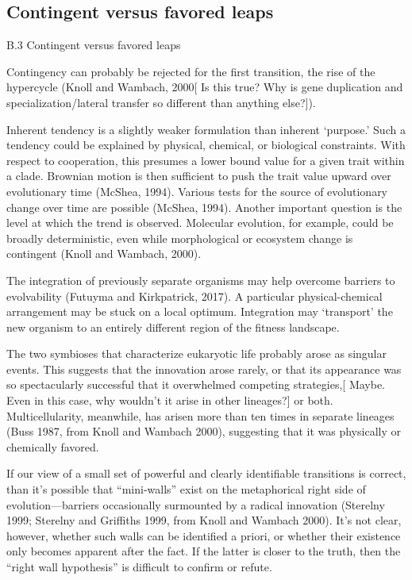 \documentclass{tufte-book} %
\begin{document}
\subsection{Contingent versus favored leaps}

B.3  Contingent versus favored leaps


Contingency can probably be rejected for the first transition, the rise of the hypercycle (Knoll and Wambach, 2000[ Is this true? Why is gene duplication and specialization/lateral transfer so different than anything else?]).

Inherent tendency is a slightly weaker formulation than inherent ‘purpose.’ Such a tendency could be explained by physical, chemical, or biological constraints.  With respect to cooperation, this presumes a lower bound value for a given trait within a clade. Brownian motion is then sufficient to push the trait value upward over evolutionary time (McShea, 1994). 
Various tests for the source of evolutionary change over time are possible (McShea, 1994).
Another important question is the level at which the trend is observed. Molecular evolution, for example, could be broadly deterministic, even while morphological or ecosystem change is contingent (Knoll and Wambach, 2000).

The integration of previously separate organisms may help overcome barriers to evolvability (Futuyma and Kirkpatrick, 2017). A particular physical-chemical arrangement may be stuck on a local optimum. Integration may ‘transport’ the new organism to an entirely different region of the fitness landscape.

The two symbioses that characterize eukaryotic life probably arose as singular events. This suggests that the innovation arose rarely, or that its appearance was so spectacularly successful that it overwhelmed competing strategies,[ Maybe. Even in this case, why wouldn’t it arise in other lineages?] or both.  Multicellularity, meanwhile, has arisen more than ten times in separate lineages (Buss 1987, from Knoll and Wambach 2000), suggesting that it was physically or chemically favored. 

If our view of a small set of powerful and clearly identifiable transitions is correct, than it’s possible that “mini-walls” exist on the metaphorical right side of evolution—barriers occasionally surmounted by a radical innovation (Sterelny 1999; Sterelny and Griffiths 1999, from Knoll and Wambach 2000). It’s not clear, however, whether such walls can be identified a priori, or whether their existence only becomes apparent after the fact. If the latter is closer to the truth, then the “right wall hypothesis” is difficult to confirm or refute.
\end{document}
